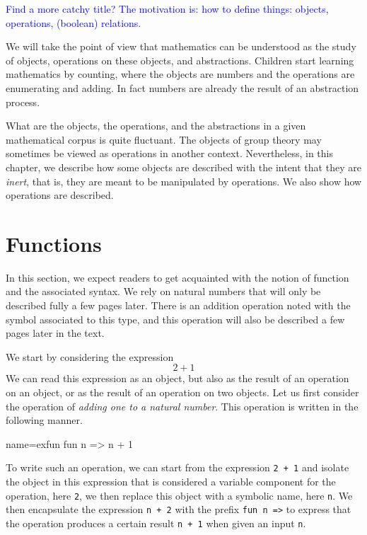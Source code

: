 \label{ch:prog}

\textcolor{blue}{Find a more catchy title? The motivation is: how to define things:
objects, operations, (boolean) relations.}

We will take the point of view that mathematics can be understood as
the study of objects, operations on these objects, and abstractions.  
Children start learning mathematics by counting, where the objects are
numbers and the operations are enumerating and adding.  In fact
numbers are already the result of an abstraction process.

What are the objects, the operations, and the abstractions in a given
mathematical corpus is quite fluctuant.  The objects of group theory
may sometimes be viewed as operations in another context.  Nevertheless,
in this chapter, we describe how some objects are described with the intent
that they are {\em inert}, that is, they are meant to be
manipulated by operations.  We also show how operations are described.

\section{Functions}
In this section, we expect readers to get acquainted with the notion
of function and the associated syntax.  We rely on natural
numbers that will only be described fully a few pages later.  There is an
addition operation noted with the \C{+} symbol associated to this
type, and this operation will also be described  a few pages later in
the text.

We start by considering the expression
\[ 2 + 1 \]
We can read this expression as an object, but also as the result of an
operation on an object, or as the result of an operation on two
objects.  Let us first consider the operation of {\em adding one to
a natural number}.  This operation is written in the following manner.

\begin{coq}{name=exfun}{}
  fun n => n + 1
\end{coq}
To write such an operation, we can start from the expression {\tt 2 +
  1} and isolate the object in this expression that is considered a
variable component for the operation, here {\tt 2}, we then replace
this object with a symbolic name, here {\tt n}.  We then encapsulate
the expression {\tt n + 2} with the prefix {\tt fun n =>} to express
that the operation produces a certain result {\tt n + 1} when given an
input {\tt n}.

